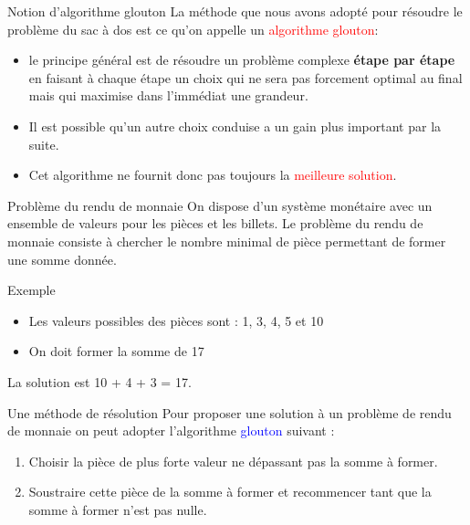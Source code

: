 \documentclass[10pt]{beamer}
\begin{document}
% 
\begin{frame}
    \mframe{\AG}
    \begin{block}{Notion d'algorithme glouton}
        La méthode que nous avons adopté pour résoudre le problème du sac à dos est ce qu'on appelle un \textcolor{red}{algorithme glouton}:
        \begin{itemize}
            \item<2->  le principe général est de résoudre un problème complexe \textbf{étape par étape} en faisant à chaque étape un choix qui ne sera pas forcement optimal au final mais qui maximise dans l'immédiat une grandeur.
            \item<3-> Il est possible qu'un autre choix conduise a un gain plus important par la suite.
            \item<4-> Cet algorithme ne fournit donc pas toujours la \textcolor{red}{meilleure solution}.
        \end{itemize}
    \end{block}
\end{frame}

% 
\begin{frame}
    \mframe{\AG}
    \begin{block}{Problème du rendu de monnaie}
        On dispose d'un système monétaire avec un ensemble de valeurs pour les pièces et les billets. Le problème du rendu de monnaie consiste à chercher le nombre minimal de pièce permettant de former une somme donnée.
    \end{block}
    \begin{exampleblock}{Exemple}
        \begin{itemize}
            \item<2-> Les valeurs possibles des pièces sont : 1, 3, 4, 5 et 10
            \item<3-> On doit former la somme de 17
        \end{itemize}
         \textcolor{OliveGreen}{La solution est 10 + 4 + 3 = 17.}
    \end{exampleblock}
\end{frame}

\begin{frame}
    \mframe{\AG}
    \begin{alertblock}{Une méthode de résolution}
        Pour proposer une solution à un problème de rendu de monnaie on peut adopter l'algorithme \textcolor{blue}{glouton} suivant :
        \begin{enumerate}
            \item<2-> Choisir la pièce de plus forte valeur ne dépassant pas la somme à former.
            \item<3-> Soustraire cette pièce de la somme à former et recommencer tant que la somme à former n'est pas nulle.
        \end{enumerate}
    \end{alertblock}
\end{frame}
\end{document}
